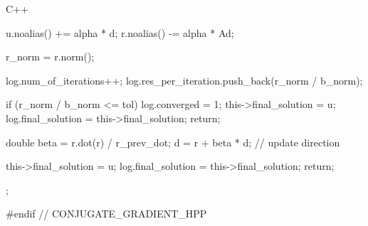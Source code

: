 \begin{codeblock}{C++}
{{{            u.noalias() += alpha * d;
            r.noalias() -= alpha * Ad;

            r_norm = r.norm();
            
            log.num_of_iterations++;
            log.res_per_iteration.push_back(r_norm / b_norm);

            if (r_norm / b_norm <= tol) 
            {   
                log.converged        = 1;
                this->final_solution = u;
                log.final_solution   = this->final_solution;
                return;
            }

            double beta = r.dot(r) / r_prev_dot;
            d           = r + beta * d; // update direction
        }
        this->final_solution = u;
        log.final_solution   = this->final_solution;
        return;
    }
};

#endif // CONJUGATE_GRADIENT_HPP
\end{codeblock}
